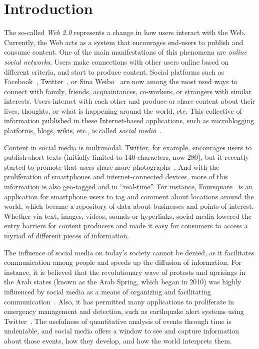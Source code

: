 \chapter{Introduction}


The so-called {\em Web 2.0} represents a change in how users interact with the
Web.
%
Currently, the Web acts as a system that encourages end-users to publish and
consume content. 
%
One of the main manifestations of this phenomena are {\em online social
networks}.
%
Users make connections with other users online based on different criteria, and
start to produce content.
%
Social platforms such as Facebook~\cite{facebook}, Twitter~\cite{twitter},
or Sina Weibo~\cite{weibo} are now among the most used ways to connect with
family, friends, acquaintances, co-workers, or strangers with similar interests.
%
Users interact with each other and produce or share content about their lives,
thoughts, or what is happening around the world, etc.    
%
This collective of information published in these Internet-based applications,
such as microblogging platforms, blogs, wikis, etc., is called {\em
social media}~\cite{kaplan2010users}.


Content in social media is multimodal. 
%
Twitter, for example, encourages users to publish short texts (initially limited
to 140 characters, now 280), but it recently started to promote that users share
more photographs~\cite{brown_2019}.
%  
And with the proliferation of smartphones and internet-connected devices, more
of this information is also geo-tagged and in ``real-time''. 
%
For instance, Foursquare~\cite{foursquare} is an application for smartphone
users to tag and comment about locations around the world, which became a
repository of data about businesses and points of interest.
%
Whether via text, images, videos, sounds or hyperlinks, social media lowered the
entry barriers for content producers and made it easy for consumers to access a
myriad of different pieces of information.





The influence of social media on today's society cannot be denied, as it
facilitates co\-mmu\-nication among people and speeds up the diffusion of
information. 
%
For instance, it is believed that the revolutionary wave of protests and
uprisings in the Arab states (known as the Arab Spring, which began in 2010) was
highly influenced by social media as a means of organizing and facilitating
communication~\cite{howard2011opening}. 
%
Also, it has permitted many applications to proliferate in emergency management
and detection, such as earthquake alert systems using
Twitter~\cite{Sakaki2010,Sakaki:Tweet:2013,Sarmiento:2018:DDE:3201064.3201077,Mendoza2019}.
%
The usefulness of quantitative analysis of events through time is undeniable, and
social media offers a window to see and capture information about those events,
how they develop, and how the world interprets them.\\

